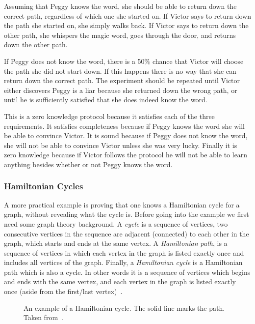 \documentclass{sig-alternate}
\begin{document}
	Assuming that Peggy knows the word, she should be able to return down
	the correct path, regardless of which one she started on. If Victor 
	says to	return down the path she started on, she simply walks back. 
	If Victor says to return down the other path, she whispers the magic
	word, goes through the door, and returns down the other path.

	If Peggy does not know the word, there is a 50\% chance that Victor
	will choose the path she did not start down. If this happens there is
	no way that she can return down the correct path. The experiment should
	be repeated until Victor either discovers Peggy is a liar because she
	returned down the wrong path, or until he is sufficiently satisfied
	that she does indeed know the word.

	This is a zero knowledge protocol because it satisfies each of the three
	requirements. It satisfies completeness because	if Peggy knows the word
	she will be able to convince Victor. It is sound because if Peggy does not 
	know the word, she will not be able to convince Victor unless she was very
	lucky. Finally it is zero knowledge because if Victor follows the protocol
	he will not be able to learn anything besides whether or not Peggy knows 
	the word.
	
	\subsubsection{Hamiltonian Cycles}
	A more practical example is proving that one knows a Hamiltonian
	cycle for a graph, without revealing what the cycle is. Before
	going into the example we first need some graph theory background.
	A \textit{cycle} is a sequence of vertices, two consecutive vertices
	in the sequence are	adjacent (connected) to each other in the graph,
	which starts and ends at the same vertex. A \textit{Hamiltonian
	path}, is a sequence of vertices in which each vertex in the graph is
	listed exactly once and includes all vertices of the graph. 
	Finally, a \textit{Hamiltonian cycle}
	is a Hamiltonian path which is also a cycle. In other words it is a
	sequence of vertices which begins and ends with the same vertex, and
	each vertex in the graph is listed exactly once (aside from the first/last
	vertex)~\cite{Wiki:Hamiltonian}.
	
	\begin{figure}
	\centering
	\caption{An example of a Hamiltonian cycle. The solid line marks the path.
	Taken from~\cite{Wiki:Hamiltonian}.}
	\label{fig:HCycle}
	\end{figure}
	
\end{document}
